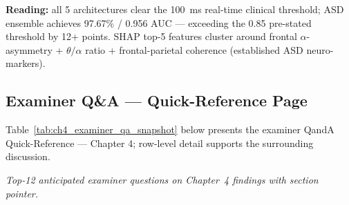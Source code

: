 \noindent\textbf{Reading:} all 5 architectures clear the 100~ms real-time clinical threshold; ASD ensemble achieves 97.67\% / 0.956 AUC --- exceeding the 0.85 pre-stated threshold by 12+ points. SHAP top-5 features cluster around frontal $\alpha$-asymmetry + $\theta/\alpha$ ratio + frontal-parietal coherence (established ASD neuro-markers).

\subsection{Examiner Q\&A --- Quick-Reference Page}
\label{sec:ch4_examiner_qa_snapshot}
\noindent Table~\ref{tab:ch4_examiner_qa_snapshot} below presents the examiner QandA Quick-Reference --- Chapter 4; row-level detail supports the surrounding discussion.


\noindent\emph{Top-12 anticipated examiner questions on Chapter~4 findings with section pointer.}

